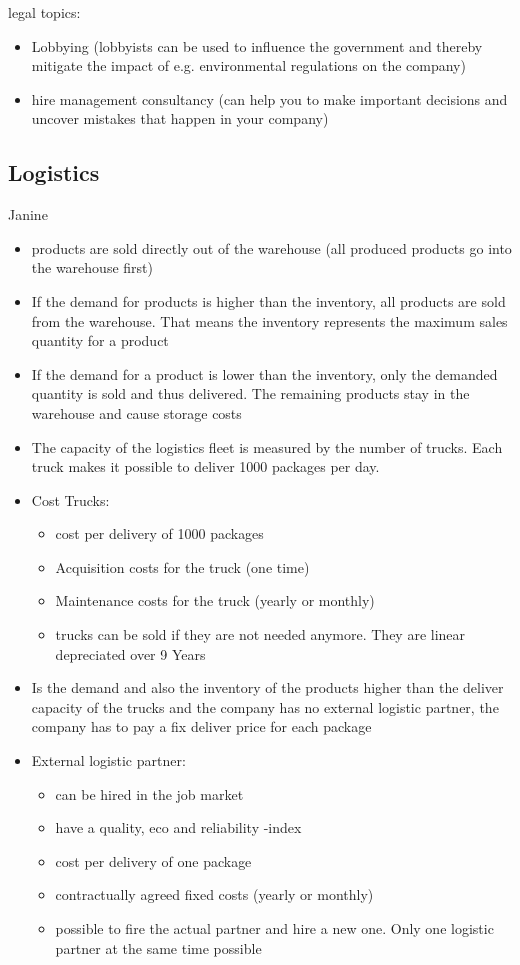 \documentclass[11pt,titlepage,oneside,openany]{book}
\begin{document}
legal topics: 
\begin{itemize} 
\item Lobbying (lobbyists can be used to influence the government and thereby mitigate the impact of e.g. environmental regulations on the company)
\item hire management consultancy (can help you to make important decisions and uncover mistakes that happen in your company) 
\end{itemize}

\subsection{Logistics}
Janine
\begin{itemize} 
\item products are sold directly out of the warehouse (all produced products go into the warehouse first) 
\item If the demand for products is higher than the inventory, all products are sold from the warehouse. That means the inventory represents the maximum sales quantity for a product
\item If the demand for a product is lower than the inventory, only the demanded quantity is sold and thus delivered. The remaining products stay in the warehouse and cause storage costs
\item The capacity of the logistics fleet is measured by the number of trucks. Each truck makes it possible to deliver 1000 packages per day.
\item Cost Trucks:
\begin{itemize}
\item cost per delivery of 1000 packages
\item Acquisition costs for the truck (one time)
\item Maintenance costs for the truck (yearly or monthly)
\item trucks can be sold if they are not needed anymore. They are linear depreciated over 9 Years  
\end{itemize}
\item Is the demand and also the inventory of the products higher than the deliver capacity of the trucks and the company has no external logistic partner, the company has to pay a fix deliver price for each package
\item External logistic partner:
\begin{itemize}
    \item can be hired in the job market
    \item have a quality, eco and reliability -index
    \item cost per delivery of one package
    \item contractually agreed fixed costs (yearly or monthly) 
    \item possible to fire the actual partner and hire a new one. Only one logistic partner at the same time possible 
\end{itemize}
\end{itemize}
\end{document}
